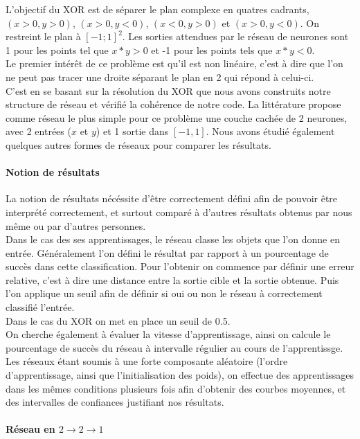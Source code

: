 L'objectif du XOR est de séparer le plan complexe en quatres cadrants, $(x >0, y > 0)$, $ (x>0, y<0)$, $ (x<0, y>0)$ et $ (x>0, y<0) $. On restreint le plan à $[-1;1]^2$. Les sorties attendues par le réseau de neurones sont 1 pour les points tel que $x*y > 0 $ et -1 pour les points tels que $x*y<0$. \\
Le premier intérêt de ce problème est qu'il est non linéaire, c'est à dire que l'on ne peut pas tracer une droite séparant le plan en 2 qui répond à celui-ci.\\

C'est en se basant sur la résolution du XOR que nous avons construits notre structure de réseau et vérifié la cohérence de notre code. La littérature propose comme réseau le plus simple pour ce problème une couche cachée de 2 neurones, avec 2 entrées ($x$ et $y$) et 1 sortie dans $[-1, 1]$. Nous avons étudié également quelques autres formes de réseaux pour comparer les résultats.

\paragraph{Notion de résultats} %
\label{par:notion_de_resultats}
La notion de résultats nécéssite d'être correctement défini afin de pouvoir être interprété correctement, et surtout comparé à d'autres résultats obtenus par nous même ou par d'autres personnes. \\
Dans le cas des ses apprentissages, le réseau classe les objets que l'on donne en entrée. Généralement l'on défini le résultat par rapport à un pourcentage de succès dans cette classification. Pour l'obtenir on commence par définir une erreur relative, c'est à dire une distance entre la sortie cible et la sortie obtenue. Puis l'on applique un seuil afin de définir si oui ou non le réseau à correctement classifié l'entrée.\\
Dans le cas du XOR on met en place un seuil de 0.5.\\
On cherche également à évaluer la vitesse d'apprentissage, ainsi on calcule le pourcentage de succès du réseau à intervalle régulier au cours de l'apprentissge. Les réseaux étant soumis à une forte composante aléatoire (l'ordre d'apprentissage, ainsi que l'initialisation des poids), on effectue des apprentissages dans les mêmes conditions plusieurs fois afin d'obtenir des courbes moyennes, et des intervalles de confiances justifiant nos résultats.

\paragraph{Réseau en $2\rightarrow2\rightarrow1$} %

